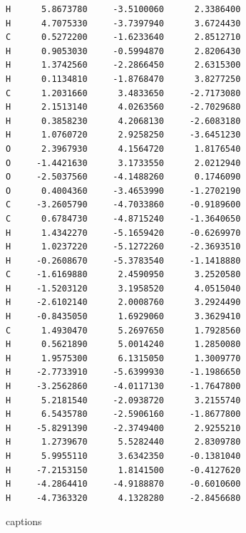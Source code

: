 \documentclass[
  digital, %
  table,   %
  lof,     %
  lot,     %
  oneside,
]{fithesis3}
\begin{document}
\begin{lstlisting}[frame=single, caption={puvodni struktura C trans },label=DescriptiveLabel]
H      5.8673780     -3.5100060      2.3386400
H      4.7075330     -3.7397940      3.6724430
C      0.5272200     -1.6233640      2.8512710
H      0.9053030     -0.5994870      2.8206430
H      1.3742560     -2.2866450      2.6315300
H      0.1134810     -1.8768470      3.8277250
C      1.2031660      3.4833650     -2.7173080
H      2.1513140      4.0263560     -2.7029680
H      0.3858230      4.2068130     -2.6083180
H      1.0760720      2.9258250     -3.6451230
O      2.3967930      4.1564720      1.8176540
O     -1.4421630      3.1733550      2.0212940
O     -2.5037560     -4.1488260      0.1746090
O      0.4004360     -3.4653990     -1.2702190
C     -3.2605790     -4.7033860     -0.9189600
C      0.6784730     -4.8715240     -1.3640650
H      1.4342270     -5.1659420     -0.6269970
H      1.0237220     -5.1272260     -2.3693510
H     -0.2608670     -5.3783540     -1.1418880
C     -1.6169880      2.4590950      3.2520580
H     -1.5203120      3.1958520      4.0515040
H     -2.6102140      2.0008760      3.2924490
H     -0.8435050      1.6929060      3.3629410
C      1.4930470      5.2697650      1.7928560
H      0.5621890      5.0014240      1.2850080
H      1.9575300      6.1315050      1.3009770
H     -2.7733910     -5.6399930     -1.1986650
H     -3.2562860     -4.0117130     -1.7647800
H      5.2181540     -2.0938720      3.2155740
H      6.5435780     -2.5906160     -1.8677800
H     -5.8291390     -2.3749400      2.9255210
H      1.2739670      5.5282440      2.8309780
H      5.9955110      3.6342350     -0.1381040
H     -7.2153150      1.8141500     -0.4127620
H     -4.2864410     -4.9188870     -0.6010600
H     -4.7363320      4.1328280     -2.8456680

  \end{lstlisting}


{\csname captions\languagename\endcsname %
\makeatletter %
  \thesis@selectLocale{\thesis@locale}\makeatother
\printbibliography[heading=bibintoc]} %
\appendix %
\end{document}

